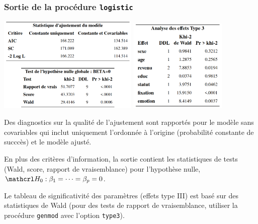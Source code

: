 \documentclass{beamer}
\begin{document}
\begin{frame}
\frametitle{Sortie \SASlang{} de la procédure \texttt{logistic}}
\begin{center}
\includegraphics[width=0.50\textwidth]{img/c4/diapos8-e11}
\includegraphics[width=0.35\textwidth]{img/c4/diapos8-e12}
\end{center}
{\small 
\bi \item Des diagnostics sur la qualité de l'ajustement sont rapportés pour le modèle sans covariables qui inclut uniquement l'ordonnée à l'origine (probabilité constante de succcès) et le modèle ajusté.
\item En plus des critères d'information, la sortie contient les statistiques de tests (Wald, score, rapport de vraisemblance) pour l'hypothèse nulle, $\Hy_0: \beta_1 = \cdots = \beta_p = 0$.
\item Le tableau de significativité des paramètres (effets type III) est basé sur des statistiques de Wald (pour des tests de rapport de vraisemblance, utiliser la procédure \texttt{genmod} avec l'option \texttt{type3}).
\ei
}
\end{frame}
\end{document}
